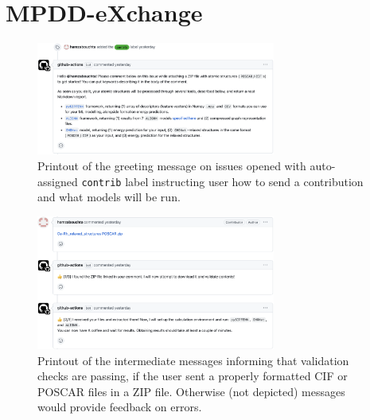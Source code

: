 \section{MPDD-eXchange} \label{mpdd:sec:mpddx}

\todo

\begin{figure}[H]
    \centering
    \includegraphics[width=0.7\textwidth]{mpdd/mpddx1.png}
    \caption{Printout of the greeting message on issues opened with auto-assigned \texttt{contrib} label instructing user how to send a contribution and what models will be run.}
    \label{mpdd:fig:mpddx1}
\end{figure}

\todo

\begin{figure}[H]
    \centering
    \includegraphics[width=0.7\textwidth]{mpdd/mpddx2.png}
    \caption{Printout of the intermediate messages informing that validation checks are passing, if the user sent a properly formatted CIF or POSCAR files in a ZIP file. Otherwise (not depicted) messages would provide feedback on errors.}
    \label{mpdd:fig:mpddx2}
\end{figure}

\todo

